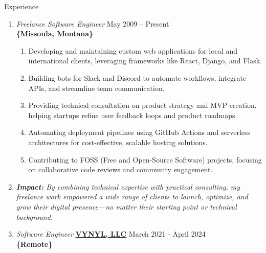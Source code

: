 \documentclass[oneside]{article}%
\begin{document}
 
\onecolumn


\renewcommand{\footrulewidth}{1pt}


\noindent
\huge{Experience}
\small
\begin{enumerate}[]
	\item \textit{Freelance Software Engineer} \hfill May 2009 -- Present\\
		\textbf{\{Missoula, Montana\}}
		\begin{enumerate}[*]
		    \item Developing and maintaining custom web applications for local and international clients, 
		          leveraging frameworks like React, Django, and Flask.
		    \item Building bots for Slack and Discord to automate workflows, integrate APIs, 
		          and streamline team communication.
		    \item Providing technical consultation on product strategy and MVP creation, helping 
		          startups refine user feedback loops and product roadmaps.
		    \item Automating deployment pipelines using GitHub Actions and serverless architectures 
		          for cost-effective, scalable hosting solutions.
		    \item Contributing to FOSS (Free and Open-Source Software) projects, focusing on 
		          collaborative code reviews and community engagement.
		\end{enumerate}
	\item \textit{\textbf{Impact:} By combining technical expertise with practical consulting, my freelance work empowered a wide range of clients to launch, optimize, and grow their digital presence—no matter their starting point or technical background.}
	\item \textit{Software Engineer} \textbf{\href{https://vynyl.com}{VYNYL, LLC}} \hfill March 2021 - April 2024\\
		\textbf{\{Remote\}}
		\begin{enumerate}[]

\end{enumerate}
\end{enumerate}
\end{document}
